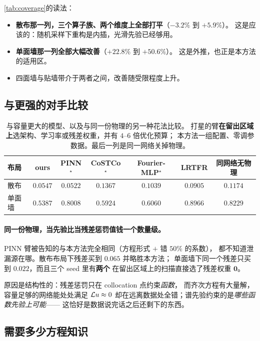 \documentclass[11pt,a4paper]{article}
\begin{document}
\cref{tab:coverage}的读法：

\begin{itemize}[leftmargin=1.6em]
  \item \textbf{散布那一列，三个算子族、两个维度上全部打平}（$-3.2\%$ 到 $+5.9\%$）。
        这是应该的：随机采样下重构是内插，光滑先验已经够用。
  \item \textbf{单面墙那一列全部大幅改善}（$+22.8\%$ 到 $+50.6\%$）。
        这是外推，也正是本方法的适用区。
  \item 四面墙与贴墙带介于两者之间，改善随受限程度上升。
\end{itemize}

\subsection{与更强的对手比较}

\begin{table}[t]
\centering
\caption{与容量更大的模型、以及与同一份物理的另一种花法比较。
打星的臂\textbf{在留出区域上}选架构、学习率或残差权重，并有 $4$--$6$ 倍优化预算；
本方法一组配置、零调参数据。最后一列是同一网络关掉物理。}
\label{tab:baselines}
\small
\begin{tabular}{lcccccc}
\toprule
布局 & ours & PINN$^\star$ & CoSTCo$^\star$ & Fourier-MLP$^\star$ & LRTFR & 同网络无物理 \\
\midrule
散布 & $0.0547$ & $\mathbf{0.0522}$ & $0.1367$ & $0.1039$ & $0.0905$ & $0.1174$ \\
单面墙 & $\mathbf{0.5387}$ & $0.8008$ & $0.5924$ & $0.6060$ & $0.8966$ & $0.8229$ \\
\bottomrule
\end{tabular}
\end{table}

\paragraph{同一份物理，当先验比当残差惩罚值钱一个数量级。}
PINN 臂被告知的与本方法完全相同（方程形式 $+$ 错 $50\%$ 的系数），
都不知道泄漏源在哪。散布布局下残差买到 $0.065$ 并略胜本方法；
单面墙下同一个残差只买到 $0.022$，而且三个 seed 里有\textbf{两个}
在留出区域上的扫描直接选了残差权重 $\mathbf{0}$。

原因是结构性的：残差惩罚只在 collocation 点约束\emph{函数}，
而齐次方程有大量解，容量足够的网络能处处满足 $\mathcal{L} u \approx 0$
却在远离数据处全错；谱先验约束的是\emph{哪些函数先验上可能}——
这恰好是数据说完话之后还剩下的东西。

\subsection{需要多少方程知识}
\end{document}
